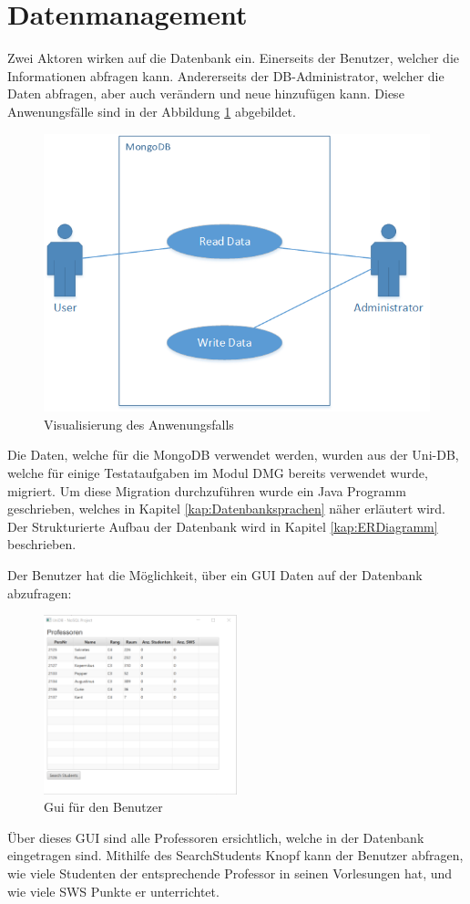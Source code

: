 \section{Datenmanagement}
Zwei Aktoren wirken auf die Datenbank ein. Einerseits der Benutzer, welcher die
Informationen abfragen kann. Andererseits der DB-Administrator, welcher die
Daten abfragen, aber auch verändern und neue hinzufügen kann. Diese
Anwenungsfälle sind in der Abbildung \ref{fig:usecase} abgebildet.

\begin{figure}[h]
  \centering
     \includegraphics[width=1\textwidth]{./pictures/UseCase.png}
  \caption{Visualisierung des Anwenungsfalls}
  \label{fig:usecase}
\end{figure}

Die Daten, welche für die MongoDB verwendet werden, wurden aus der Uni-DB, welche für einige Testataufgaben im Modul DMG bereits verwendet wurde, migriert. Um diese Migration durchzuführen wurde ein Java Programm geschrieben, welches in Kapitel \ref{kap:Datenbanksprachen} näher erläutert wird. Der Strukturierte Aufbau der Datenbank wird in Kapitel \ref{kap:ERDiagramm} beschrieben.

\newpage
Der Benutzer hat die Möglichkeit, über ein GUI Daten auf der Datenbank abzufragen:
\begin{figure}[h]
	\centering
	\includegraphics[width=0.5\textwidth]{./pictures/UniDBView.png}
	\caption{Gui für den Benutzer}
	\label{fig:GUI1}
\end{figure}

Über dieses GUI sind alle Professoren ersichtlich, welche in der Datenbank eingetragen sind.
Mithilfe des SearchStudents Knopf kann der Benutzer abfragen, wie viele Studenten der entsprechende Professor in seinen Vorlesungen hat, und wie viele SWS Punkte er unterrichtet.
